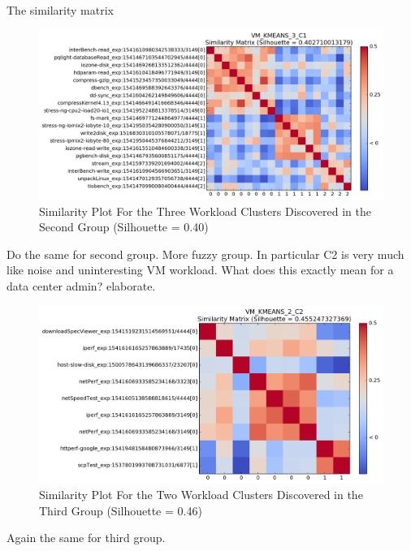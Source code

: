 \documentclass[10pt, conference, compsocconf]{IEEEtran}
\begin{document}
The similarity matrix 

\begin{figure}[!htpb]
\centering
\includegraphics[width=\textwidth]{figs/VM_KMEANS_3_C1.png}
\caption{Similarity Plot For the Three Workload Clusters Discovered in the Second Group (Silhouette = 0.40)}
\label{fig:c1-sim}
\end{figure}
Do the same for second group. More fuzzy group. In particular C2 is very much like noise and uninteresting VM workload. What does this exactly mean for a data center admin? elaborate. 

\begin{figure}[!htpb]
\centering
\includegraphics[width=\textwidth]{figs/VM_KMEANS_2_C2.png}
\caption{Similarity Plot For the Two Workload Clusters Discovered in the Third Group (Silhouette = 0.46)}
\label{fig:c2-sim}
\end{figure}
Again the same for third group.
\end{document}
